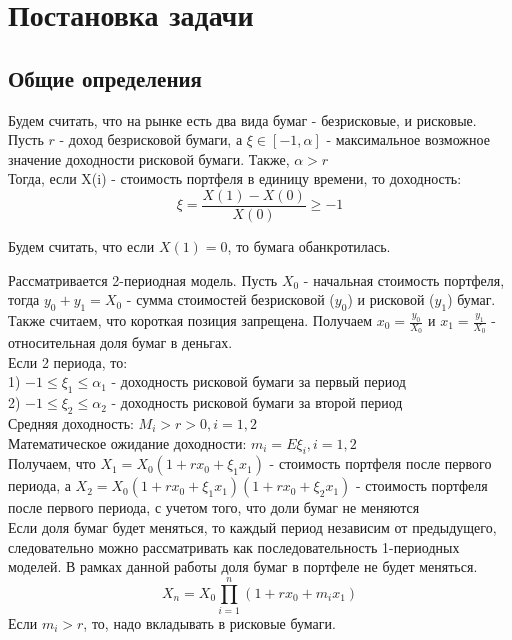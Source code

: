 \documentclass[18pt,a4paper]{article}
\theoremstyle{plain}
\theoremstyle{definition}
\begin{document}
\centering\section{Постановка задачи}
\flushleft

\centering\subsection{Общие определения}
\flushleft
\noindent Будем считать, что на рынке есть два вида бумаг - безрисковые, и рисковые. Пусть $r$ - доход безрисковой бумаги, а $\xi \in [-1, \alpha]$ - максимальное возможное значение доходности рисковой бумаги. Также, $\alpha > r$\\

Тогда, если X(i) - стоимость портфеля в единицу времени, то доходность:
$$
\xi = \frac{X(1)-X(0)}{X(0) }\ge -1
$$

Будем считать, что если $X(1)=0$, то бумага обанкротилась.\\
\vspace{1em}

Рассматривается 2-периодная модель. Пусть $X_0$ - начальная стоимость портфеля, тогда $y_0 + y_1 = X_0$ - сумма стоимостей безрисковой ($y_0$) и рисковой ($y_1$) бумаг. Также считаем, что короткая позиция запрещена. Получаем $x_0 = \frac{y_0}{X_0}$ и $x_1 = \frac{y_1}{X_0}$ - относительная доля бумаг в деньгах.\\

\vspace{5mm}
Если 2 периода, то:\\
1) $-1\le \xi_1 \le \alpha_1$ - доходность рисковой бумаги за первый период\\
2) $-1\le \xi_2 \le \alpha_2$ - доходность рисковой бумаги за второй период\\
\vspace{3mm}
Средняя доходность: $M_i>r>0, i =1,2$\\
Математическое ожидание доходности: $m_i = E\xi_i, i =1,2$\\
\vspace{3mm}
Получаем, что $X_1 = X_0(1+rx_0+\xi_1 x_1) $ - стоимость портфеля после первого периода, а $X_2 = X_0(1+rx_0+\xi_1 x_1)(1+rx_0+\xi_2 x_1) $ - стоимость портфеля после первого периода, с учетом того, что доли бумаг не меняются\\
\vspace{3mm}
Если доля бумаг будет меняться, то каждый период независим от предыдущего, следовательно можно рассматривать как последовательность 1-периодных моделей. В рамках данной работы доля бумаг в портфеле не будет меняться.\\
\vspace{3mm}
$$
X_n = X_0 \prod\limits_{i=1}^n (1+rx_0+m_i x_1)
$$
\vspace{3mm}
Если $m_i > r$, то, надо вкладывать в рисковые бумаги.\\
\end{document}
